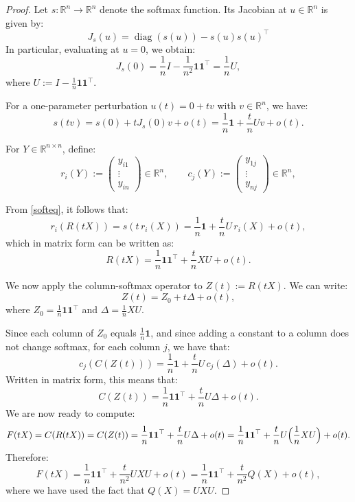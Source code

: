 \documentclass[10pt,a4paper]{amsart}
\newcommand{\R}{\mathbb{R}}
\newcommand{\lra}{\longrightarrow}
\begin{document}
\begin{proof}
Let $s: \R^n \lra \R^n$ denote the softmax function. Its Jacobian at $u \in \R^n$ is given by:
$$
J_s(u)=\operatorname{diag}(s(u)) - s(u)s(u)^\top
$$
In particular, evaluating at $u = 0$, we obtain:
\[
J_s(0) = \frac{1}{n} I - \frac{1}{n^2} \mathbf{1}\mathbf{1}^\top= \frac{1}{n} U,
\]
where $U := I - \frac{1}{n} \mathbf{1}\mathbf{1}^\top$.

For a one-parameter perturbation $u(t)=0+t v$ with $v\in\mathbb{R}^n$, we have:
\begin{equation}\label{softeq}
s(tv)=s(0)+tJ_s(0)v+o(t)=\frac{1}{n}\mathbf{1}+\frac{t}{n}Uv+o(t).
\end{equation}

For $Y\in \R^{n\times n}$, define:
$$
r_i(Y):=\begin{pmatrix}y_{i1}\\ \vdots \\ y_{in}\end{pmatrix}\in\mathbb{R}^n,
\qquad
c_j(Y):=\begin{pmatrix}y_{1j}\\ \vdots \\ y_{nj}\end{pmatrix}\in\mathbb{R}^n,
$$

From \ref{softeq}, it follows that:
\[
r_i(R(tX))=s(t\,r_i(X))=\frac{1}{n}\mathbf{1}+\frac{t}{n}U\,r_i(X)+o(t), 
\]
which in matrix form can be written as:
\[
R(tX)=\frac{1}{n}\mathbf{1}\mathbf{1}^\top+\frac{t}{n}XU+o(t). 
\]

We now apply the column-softmax operator to $Z(t):=R(tX)$. We can write: 
\[
Z(t)=Z_0+t\Delta+o(t),
\]
where $Z_0=\frac{1}{n}\mathbf{1}\mathbf{1}^\top$ and $\Delta=\frac{1}{n}XU$.

Since each column of $Z_0$ equals $\frac{1}{n}\mathbf{1}$, and since adding a constant to a column does not change softmax, for each column $j$, we have that: 
\[
c_j(C(Z(t)))=\frac{1}{n}\mathbf{1}+\frac{t}{n}U\,c_j(\Delta)+o(t). 
\]
Written in matrix form, this means that: 
\[
C(Z(t))=\frac{1}{n}\mathbf{1}\mathbf{1}^\top+\frac{t}{n}U\Delta+o(t).
\]
We are now ready to compute:
\[
F(tX)=C(R(tX))=C(Z(t))
=
\frac{1}{n}\mathbf{1}\mathbf{1}^\top+\frac{t}{n}U\Delta+o(t)
=
\frac{1}{n}\mathbf{1}\mathbf{1}^\top+\frac{t}{n}U\Bigl(\frac{1}{n}XU\Bigr)+o(t).
\]
Therefore:
\[
F(tX)
=
\frac{1}{n}\mathbf{1}\mathbf{1}^\top+\frac{t}{n^2}UXU+o(t)
=
\frac{1}{n}\mathbf{1}\mathbf{1}^\top+\frac{t}{n^2}Q(X)+o(t),
\]
where we have used the fact that $Q(X)=UXU$.
\end{proof}
\end{document}
